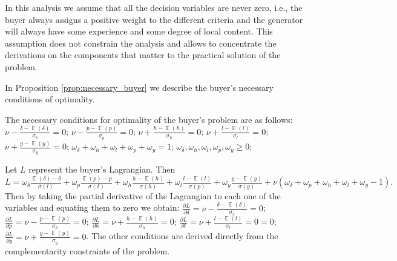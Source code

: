 \documentclass[informs]{informs3}
\begin{document}
In this analysis we assume that all the decision variables are never zero, i.e., the buyer always assigns a positive weight to the different criteria and the generator will always have some experience and some degree of local content. This assumption does not constrain the analysis and allows to concentrate the derivations on the components that matter to the practical solution of the problem.


In Proposition \ref{prop:necessary_buyer} we describe the buyer's necessary conditions of optimality. 
 
 
\begin{proposition}\label{prop:necessary_buyer}
The necessary conditions for optimality of the buyer's problem are as follows:
$\nu - \frac{\delta-\mathop{\mathbb{E}}\left(\delta\right)}{\sigma_{\delta}}=0$;
$\nu - \frac{p-\mathop{\mathbb{E}}\left(p\right)}{\sigma_{p}}=0$;
$\nu + \frac{h-\mathop{\mathbb{E}}\left(h\right)}{\sigma_{h}}=0$;
$\nu + \frac{l-\mathop{\mathbb{E}}\left(l\right)}{\sigma_{l}}=0$;
$\nu + \frac{y-\mathop{\mathbb{E}}\left(y\right)}{\sigma_{y}}=0$;
$\omega_{\delta}+\omega_{h}+\omega_{l}+\omega_{p}+\omega_{y}=1 $;		
$\omega_{\delta},\omega_{h},\omega_{l},\omega_{p},\omega_{y} \geq 0$;
\end{proposition}
%
Let $L$ represent the buyer's Lagrangian. Then 
$L =\omega_{\delta}\frac{\mathop{\mathbb{E}}\left(\delta\right)-\delta }
{\sigma\left(l\right)}+\omega_{p}\frac{\mathop{\mathbb{E}}\left(p\right)-p}  {\sigma\left(\delta\right)} 
+\omega_{h}\frac{ h-\mathop{\mathbb{E}}\left(h\right)}
{\sigma\left(h\right)}+\omega_{l}\frac{ l-\mathop{\mathbb{E}}\left(l\right) }{\sigma\left(p\right)}+\omega_{y}\frac{y-\mathop{\mathbb{E}}\left(y\right)}{\sigma\left(y\right)}+\nu (\omega_{\delta}+\omega_{p}+\omega_{h}+\omega_{l}+\omega_{y}-1).$ 
Then by taking the partial derivative of the Lagrangian to each one of the variables and equating them to zero we obtain:
$\frac{\partial L}{\partial \delta} = \nu - \frac{\delta-\mathop{\mathbb{E}}\left(\delta\right)}{\sigma_{\delta}}=0$;
$\frac{\partial L}{\partial p} = \nu - \frac{p-\mathop{\mathbb{E}}\left(p\right)}{\sigma_{p}}=0$;
$\frac{\partial L}{\partial h} = \nu + \frac{h-\mathop{\mathbb{E}}\left(h\right)}{\sigma_{h}}=0$;
$\frac{\partial L}{\partial l} = \nu + \frac{l-\mathop{\mathbb{E}}\left(l\right)}{\sigma_{l}}=0=0$;
$\frac{\partial L}{\partial y} = \nu + \frac{y-\mathop{\mathbb{E}}\left(y\right)}{\sigma_{y}}=0$.
The other conditions are derived directly from the complementarity constraints of the problem. %
\Halmos
\endproof 
\end{document}
